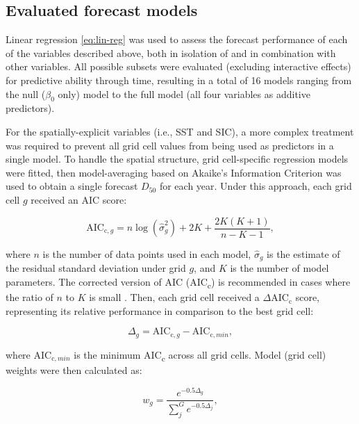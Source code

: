 \documentclass[12pt,]{book}
\theoremstyle{definition}
\theoremstyle{definition}
\theoremstyle{definition}
\theoremstyle{remark}
\begin{document}
\subsection{Evaluated forecast models}\label{rtf-models}

\noindent
Linear regression \eqref{eq:lin-reg} was used to assess the forecast
performance of each of the variables described above, both in isolation
of and in combination with other variables. All possible subsets were
evaluated (excluding interactive effects) for predictive ability through
time, resulting in a total of 16 models ranging from the null
(\(\beta_0\) only) model to the full model (all four variables as
additive predictors).

For the spatially-explicit variables (i.e., SST and SIC), a more complex
treatment was required to prevent all grid cell values from being used
as predictors in a single model. To handle the spatial structure, grid
cell-specific regression models were fitted, then model-averaging
\citep{burnham-anderson-2002} based on Akaike's Information Criterion
\citep[AIC,][]{akaike-1974} was used to obtain a single forecast
\(D_{50}\) for each year. Under this approach, each grid cell \(g\)
received an AIC score:

\begin{equation}
  \text{AIC}_{\text{c},g}=n \log{\left(\hat{\sigma}_g^2\right) + 2K + \frac{2K(K+1)}{n-K-1}},
  \label{eq:aicc}
\end{equation}

\noindent
where \(n\) is the number of data points used in each model,
\(\hat{\sigma}_g\) is the estimate of the residual standard deviation
under grid \(g\), and \(K\) is the number of model parameters. The
corrected version of AIC (AIC\textsubscript{c}) is recommended in cases
where the ratio of \(n\) to \(K\) is small
\citep{burnham-anderson-2002}. Then, each grid cell received a
\(\Delta\text{AIC}_\text{c}\) score, representing its relative
performance in comparison to the best grid cell:

\begin{equation}
  \Delta_g=\text{AIC}_{\text{c},g}-\text{AIC}_{\text{c},min},
  \label{eq:delta-aicc}
\end{equation}

\noindent
where \(\text{AIC}_{\text{c},min}\) is the minimum AIC\textsubscript{c}
across all grid cells. Model (grid cell) weights were then calculated
as:

\begin{equation}
  w_g=\frac{e^{-0.5\Delta_g}}{\sum_j^G e^{-0.5\Delta_j}},
\label{eq:aicc-weights}
\end{equation}
\end{document}

